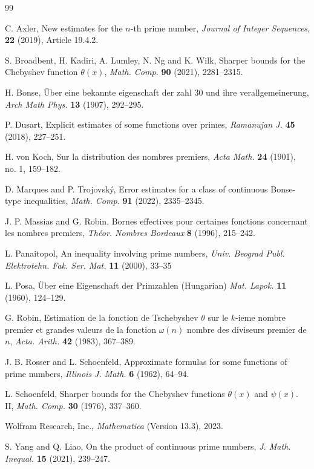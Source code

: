 \documentclass[10pt]{amsart}
\theoremstyle{definition} %
\numberwithin{equation}{section}
\begin{document}
\begin{thebibliography}{99}



C. Axler, New estimates for the $n$-th prime number, {\it Journal of Integer Sequences}, {\bf 22} (2019), Article 19.4.2.

 S. Broadbent, H. Kadiri, A. Lumley, N. Ng and K. Wilk, Sharper bounds for the Chebyshev function $\theta(x)$, {\it Math. Comp.} {\bf 90} (2021), 2281--2315.

H. Bonse, \"{U}ber eine bekannte eigenschaft der zahl 30 und ihre verallgemeinerung, {\it Arch Math Phys.} {\bf 13} (1907), 292--295.

P. Dusart, Explicit estimates of some functions over primes, {\it Ramanujan J.} {\bf 45} (2018), 227--251.

H. von Koch, Sur la distribution des nombres premiers,
{\it Acta Math.} {\bf 24} (1901), no. 1, 159--182.

D. Marques and P. Trojovsk\'y, Error estimates for a class of continuous Bonse-type inequalities, {\it Math. Comp.} {\bf 91} (2022), 2335--2345.

J. P. Massias and G. Robin, Bornes effectives pour certaines fonctions concernant les nombres
premiers, {\it Th\' eor. Nombres Bordeaux} {\bf 8} (1996), 215--242.

L. Panaitopol, An inequality involving prime numbers, {\it Univ. Beograd Publ. Elektrotehn. Fak. Ser. Mat.} {\bf 11} (2000), 33--35

L. Posa, \"{U}ber eine Eigenschaft der Primzahlen (Hungarian) {\it Mat. Lapok.} {\bf 11} (1960), 124--129.

G. Robin, Estimation de la fonction de Tschebyshev $\theta$ sur le $k$-ieme nombre premier et grandes valeurs de la fonction $\omega(n)$ nombre des diviseurs premier de $n$, {\it Acta. Arith.} {\bf 42} (1983), 367--389.

J. B. Rosser and L. Schoenfeld, Approximate formulas for some functions of prime numbers, {\it Illinois J. Math.} {\bf 6} (1962), 64--94.

L. Schoenfeld, Sharper bounds for the Chebyshev functions $\theta(x)$ and $\psi(x)$. II, {\it Math. Comp.} {\bf 30} (1976), 337--360.

 Wolfram Research, Inc., \emph{Mathematica} (Version 13.3), 2023.

 S. Yang and Q. Liao, On the product of continuous prime numbers, {\it J. Math. Inequal.} {\bf 15} (2021), 239--247.

\end{thebibliography}
\end{document}
